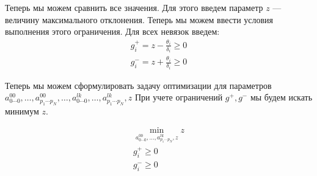 \documentclass[a4paper,12pt]{article}
\begin{document}
  Теперь мы можем сравнить все значения. Для этого введем параметр $z$ ---
  величину максимального отклонения. Теперь мы можем ввести условия выполнения этого ограничения.
  Для всех невязок введем:
  \begin{eqnarray}
    g^{+}_i = z - \frac{\theta_i}{\delta_i} \ge 0\\
    g^{-}_i = z + \frac{\theta_i}{\delta_i} \ge 0
  \end{eqnarray}

  Теперь мы можем сформулировать задачу оптимизации для параметров
  $a^{00}_{0 \cdots 0},\ldots,a^{00}_{p_1 \cdots p_N},\ldots,a^{lk}_{0 \cdots 0},\ldots,a^{lk}_{p_1 \cdots p_N},z$
  При учете ограничений $g^{+},g^{-}$ мы будем искать минимум $z$.

  \begin{eqnarray*}
    \min_{a^{00}_{0 \cdots 0},\ldots,a^{lk}_{p_1 \cdots p_N},z} z \\
    g^{+}_i \ge 0 \\
    g^{-}_i \ge 0
  \end{eqnarray*}
  
  
  
\end{document}
